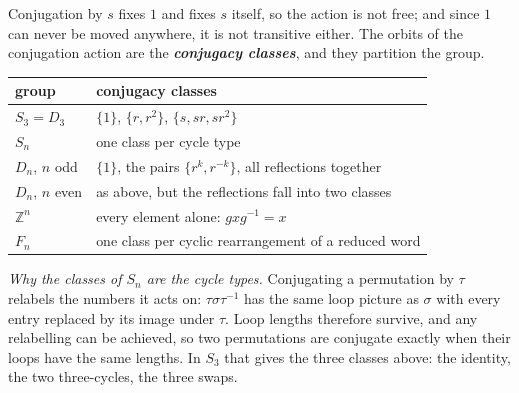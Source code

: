 \documentclass[10pt]{article}
\newcommand{\defterm}[1]{\textbf{\itshape #1}}
\newcommand{\Z}{\mathbb{Z}}
\newcommand{\inv}{^{-1}}
\begin{document}
{\begin{minipage}[t]{744pt}
{
}\par\vspace{3pt}
\begin{minipage}[t]{360pt}\vspace{0pt}
Conjugation by $s$ fixes $1$ and fixes $s$ itself, so the action is not free; and since $1$ can never be moved anywhere, it is not transitive either. The orbits of the conjugation action are the \defterm{conjugacy classes}, and they partition the group.\par\vspace{3pt}
\centering
\begin{tabular}{@{}ll@{}}
\toprule
group & conjugacy classes\\
\midrule
$S_3=D_3$ & $\{1\}$, $\{r,r^2\}$, $\{s,sr,sr^2\}$\\
$S_n$ & one class per cycle type\\
$D_n$, $n$ odd & $\{1\}$, the pairs $\{r^k,r^{-k}\}$, all reflections together\\
$D_n$, $n$ even & as above, but the reflections fall into two classes\\
$\Z^n$ & every element alone: $gxg\inv=x$\\
$F_n$ & one class per cyclic rearrangement of a reduced word\\
\bottomrule
\end{tabular}
\end{minipage}\hfill
\begin{minipage}[t]{368pt}\vspace{0pt}
\begin{why}
\emph{Why the classes of $S_n$ are the cycle types.} Conjugating a permutation by $\tau$ relabels the numbers it acts on: $\tau\sigma\tau\inv$ has the same loop picture as $\sigma$ with every entry replaced by its image under $\tau$. Loop lengths therefore survive, and any relabelling can be achieved, so two permutations are conjugate exactly when their loops have the same lengths. In $S_3$ that gives the three classes above: the identity, the two three-cycles, the three swaps.

\end{why}
\end{minipage}
\end{minipage}}
\end{document}
